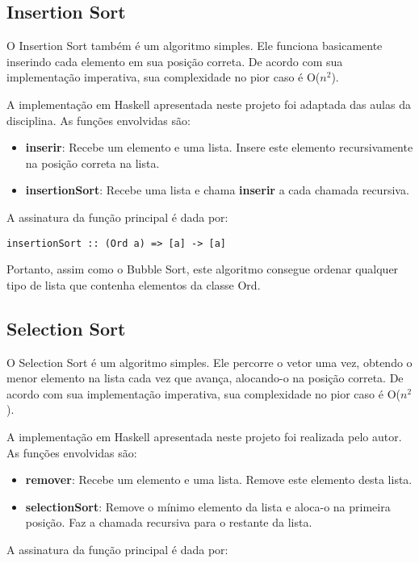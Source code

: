 \documentclass[12pt,a4paper]{article}
\begin{document}
\subsection{Insertion Sort}
O Insertion Sort também é um algoritmo simples. Ele funciona basicamente inserindo cada elemento em sua posição correta. De acordo com sua implementação imperativa, sua complexidade no pior caso é O($n^2$). 

A implementação em Haskell apresentada neste projeto foi adaptada das aulas da disciplina. As funções envolvidas são:

\begin{itemize}
\item \textbf{inserir}: Recebe um elemento e uma lista. Insere este elemento recursivamente na posição correta na lista.
\item \textbf{insertionSort}: Recebe uma lista e chama \textbf{inserir} a cada chamada recursiva.
\end{itemize}

A assinatura da função principal é dada por:

\begin{lstlisting}
insertionSort :: (Ord a) => [a] -> [a]
\end{lstlisting}

Portanto, assim como o Bubble Sort, este algoritmo consegue ordenar qualquer tipo de lista que contenha elementos da classe Ord.


\subsection{Selection Sort}
O Selection Sort é um algoritmo simples. Ele percorre o vetor uma vez, obtendo o menor elemento na lista cada vez que avança, alocando-o na posição correta. De acordo com sua implementação imperativa, sua complexidade no pior caso é O($n^2$). 

A implementação em Haskell apresentada neste projeto foi realizada pelo autor. As funções envolvidas são:

\begin{itemize}
\item \textbf{remover}: Recebe um elemento e uma lista. Remove este elemento desta lista.
\item \textbf{selectionSort}: Remove o mínimo elemento da lista e aloca-o na primeira posição. Faz a chamada recursiva para o restante da lista.
\end{itemize}

A assinatura da função principal é dada por:
\end{document}
